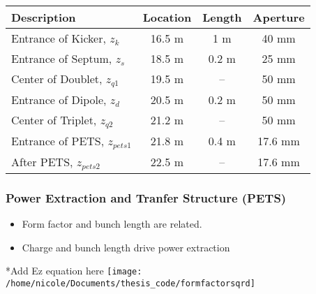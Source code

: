 \documentclass[professionalfonts,t]{beamer}
\begin{document}
\begin{frame}
\vspace{1em}
\begin{minipage}{0.55\textwidth}
\begin{table}[hbt] 
\centering
\begin{tabular}{ l *{3}{c}}
	\toprule
	\textbf{Description} & \textbf{Location} & \textbf{Length} & \textbf{Aperture}\\
	\midrule
	Entrance of Kicker, 	$ z_k$ 		& 16.5 m & 1 m   & 40 mm\\
	Entrance of Septum, 	$ z_s$  	& 18.5 m & 0.2 m & 25 mm\\
	Center of Doublet, 		$ z_{q1}$	& 19.5 m & -- 	 & 50 mm\\
	Entrance of Dipole, 	$ z_d$  	& 20.5 m & 0.2 m & 50 mm\\
	Center of Triplet,		$ z_{q2}$	& 21.2 m & --    & 50 mm\\
	Entrance of PETS, $z_{pets1}$  & 21.8 m & 0.4 m 	 & 17.6 mm\\
	After PETS, 			$z_{pets2}$ & 22.5 m &  --   & 17.6 mm\\
	\bottomrule	
\end{tabular}	
\end{table}
\end{minipage}
\end{frame}

\begin{frame}
\frametitle{Power Extraction and Tranfer Structure (PETS)}
\begin{itemize}
\item Form factor and bunch length are related. 
\item Charge and bunch length drive power extraction
\end{itemize}

\vspace{1em}
*Add Ez equation here
\centering
\texttt{[image: /home/nicole/Documents/thesis\_code/formfactorsqrd]}

\end{frame}
\end{document}
